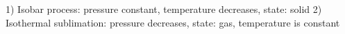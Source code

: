 1) Isobar process: pressure constant, temperature decreases, state: solid  
2) Isothermal sublimation: pressure decreases, state: gas, temperature is constant
